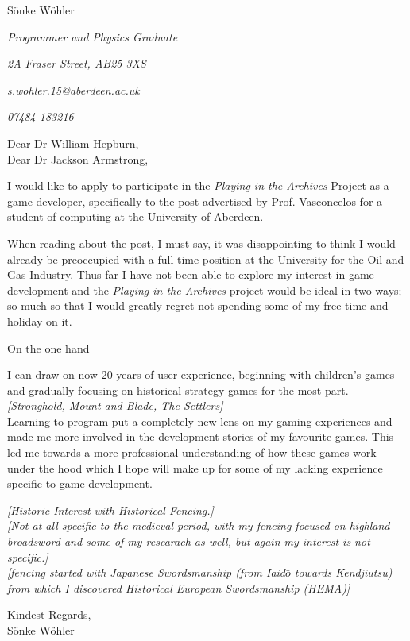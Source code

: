 \documentclass[paper=a4,fontsize=11pt]{scrartcl} %
\newcommand{\sepspace}{\vspace*{1em}}		%
\newcommand{\MyName}[1]{ %
  \Huge \usefont{OT1}{phv}{b}{n} \hfill #1
  \par \normalsize \normalfont}
\newcommand{\MySlogan}[5]{ %
  \large \usefont{OT1}{phv}{m}{n}\hfill \textit{#1} 
  \sepspace
  \par \normalsize \usefont{OT1}{phv}{m}{n}\hfill \textit{#2}
  \par \normalsize \usefont{OT1}{phv}{m}{n}\hfill \textit{#3}
  \par \normalsize \usefont{OT1}{phv}{m}{n}\hfill \textit{#4}
  \par \normalsize \usefont{OT1}{phv}{m}{n}\hfill \textit{#5}
  \par \normalsize \normalfont}
\begin{document}
  
  \MyName{S\"onke W\"ohler}
  \MySlogan{Programmer and Physics Graduate}{2A Fraser Street, AB25 3XS}{s.wohler.15@aberdeen.ac.uk}{07484 183216}{}
  \sepspace \sepspace
  
  \noindent
  Dear Dr William Hepburn, \\
  Dear Dr Jackson Armstrong,
  
  \sepspace
  
  \noindent
  I would like to apply to participate in the \textit{Playing in the Archives} Project as a game developer, specifically to the post advertised by Prof. Vasconcelos for a student of computing at the University of Aberdeen. 
  \sepspace
  
  \noindent
  When reading about the post, I must say, it was disappointing to think I would already be preoccupied with a full time position at the University for the Oil and Gas Industry. Thus far I have not been able to explore my interest in game development and the \textit{Playing in the Archives} project would be ideal in two ways; so much so that I would greatly regret not spending some of my free time and holiday on it.
  \sepspace
  
  \noindent
  On the one hand 
  \sepspace
  
  \noindent
  I can draw on now 20 years of user experience, beginning with children's games and gradually focusing on historical strategy games for the most part. \\
  \textit{[Stronghold, Mount and Blade, The Settlers]} \\
  Learning to program put a completely new lens on my gaming experiences and made me more involved in the development stories of my favourite games. This led me towards a more professional understanding of how these games work under the hood which I hope will make up for some of my lacking experience specific to game development. 
  \sepspace
  
  \noindent  
  \textit{[Historic Interest with Historical Fencing.]} \\
  \textit{[Not at all specific to the medieval period, with my fencing focused on highland broadsword and some of my researach as well, but again my interest is not specific.]} \\
  \textit{[fencing started with Japanese Swordsmanship (from Iaid$\bar o$ towards Kendjiutsu) from which I discovered Historical European Swordsmanship (HEMA)]}
  
  


  \sepspace
  
  \noindent
  Kindest Regards, \\
  S\"onke W\"ohler
  
  
  
\end{document}
